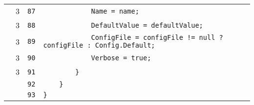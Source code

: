 \documentclass[a4paper,10pt]{article}
\begin{document}
\begin{longtable}[l]{lrrl}
\cellcolor{green} & 3 & \verb~87~ & \verb~            Name = name;~\\
\cellcolor{green} & 3 & \verb~88~ & \verb~            DefaultValue = defaultValue;~\\
\cellcolor{green} & 3 & \verb~89~ & \verb~            ConfigFile = configFile != null ? configFile : Config.Default;~\\
\cellcolor{green} & 3 & \verb~90~ & \verb~            Verbose = true;~\\
\cellcolor{green} & 3 & \verb~91~ & \verb~        }~\\
\cellcolor{gray} &  & \verb~92~ & \verb~    }~\\
\cellcolor{gray} &  & \verb~93~ & \verb~}~\\
\end{longtable}
\end{document}
